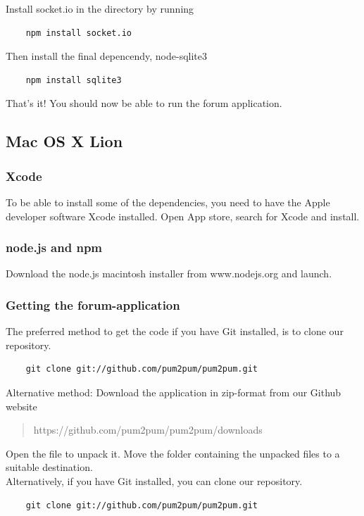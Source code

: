 \documentclass[a4paper, 12pt, titlepage]{article}
\begin{document}
	Install socket.io in the directory by running

	\begin{lstlisting}
	npm install socket.io
	\end{lstlisting}

	Then install the final depencendy, node-sqlite3

	\begin{lstlisting}
	npm install sqlite3
	\end{lstlisting}

	That's it! You should now be able to run the forum application.



	\subsection{Mac OS X Lion}
	\label{sec:osxinstall}


	\subsubsection{Xcode}
	To be able to install some of the dependencies, you need to have the Apple developer software Xcode installed. Open App store, search for Xcode and install.


	\subsubsection{node.js and npm}
	Download the node.js macintosh installer from www.nodejs.org and launch.

	\subsubsection{Getting the forum-application}
	The preferred method to get the code if you have Git installed, is to clone our repository.
	\begin{lstlisting}
	git clone git://github.com/pum2pum/pum2pum.git
	\end{lstlisting}

	Alternative method: Download the application in zip-format from our Github website
	\begin{quote}
	https://github.com/pum2pum/pum2pum/downloads
	\end{quote}
	Open the file to unpack it. Move the folder containing the unpacked files to a suitable destination.\\

	Alternatively, if you have Git installed, you can clone our repository.
	\begin{lstlisting}
	git clone git://github.com/pum2pum/pum2pum.git
	\end{lstlisting}
  
\end{document}
